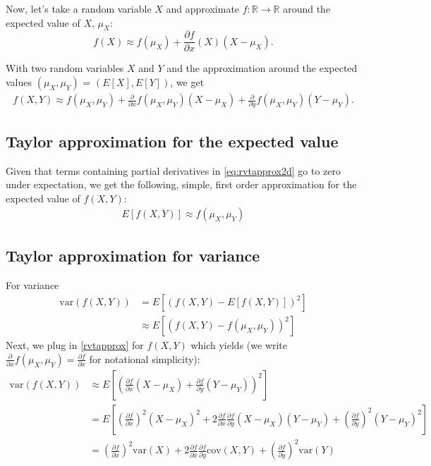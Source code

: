\documentclass{article}
\begin{document}
Now, let's take a random variable $X$ and approximate $f: \mathbb{R} \rightarrow \mathbb{R}$ around the expected value of $X$, $\mu_X$:
\begin{equation}
    f(X) \approx f(\mu_X) + \frac{\partial f}{\partial x}(X)(X-\mu_X) \label{eq:rvtapprox1d}.
\end{equation}

With two random variables $X$ and $Y$ and the approximation around the expected values $(\mu_X, \mu_Y)$ = $(E[X], E[Y])$, we get
\begin{align}
    f(X, Y) \approx f(\mu_X, \mu_Y) + \frac{\partial }{\partial x} f(\mu_X, \mu_Y) (X - \mu_X) + \frac{\partial }{\partial y} f(\mu_X, \mu_Y) (Y - \mu_Y) \label{eq:rvtapprox2d}.
\end{align}

\subsection{Taylor approximation for the expected value}
Given that terms containing partial derivatives in \eqref{eq:rvtapprox2d} go to zero under expectation, we get the following, simple, first order approximation for the expected value of $f(X, Y)$:
\begin{align}
    E[f(X, Y)] \approx f(\mu_X, \mu_Y) \label{eapprox}
\end{align}

\subsection{Taylor approximation for variance}
For variance
\begin{align}
    \text{var}(f(X, Y)) &= E\left[ \left(f(X, Y) - E[f(X,Y)] \right)^2 \right] \nonumber \\
    &\approx E\left[ \left( f(X, Y) - f(\mu_X, \mu_Y) \right)^2 \right] \nonumber
\end{align}
Next, we plug in \eqref{rvtapprox} for $f(X,Y)$ which yields (we write $\frac{\partial }{\partial x} f(\mu_X, \mu_Y) = \frac{\partial f}{\partial x}$ for notational simplicity):
\begin{align}
    \text{var}(f(X, Y)) &\approx E\left[ \left( \frac{\partial f}{\partial x} (X - \mu_X) + \frac{\partial f}{\partial y} (Y - \mu_Y) \right)^2 \right] \nonumber \\
    &= E\left[ \left( \frac{\partial f}{\partial x}  \right)^2 (X - \mu_X)^2 + 2 \frac{\partial f}{\partial x} \frac{\partial f}{\partial y} (X - \mu_X)(Y - \mu_Y) + \left( \frac{\partial f}{\partial y}  \right)^2 (Y - \mu_Y)^2  \right] \nonumber \\
    &= \left( \frac{\partial f}{\partial x}  \right)^2 \text{var}(X) + 2 \frac{\partial f}{\partial x} \frac{\partial f}{\partial y} \text{cov}(X, Y) + \left( \frac{\partial f}{\partial y}  \right)^2 \text{var}(Y) \label{eq:varapprox2d}
\end{align}
\end{document}
